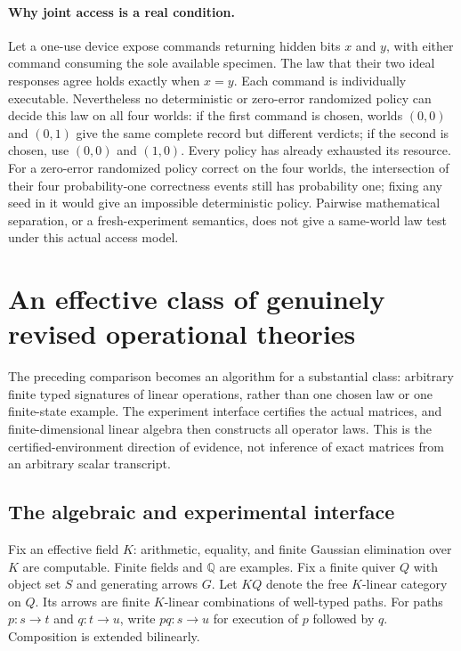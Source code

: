 \documentclass[11pt]{article}
\theoremstyle{definition}
\theoremstyle{remark}\newtheorem{remark}[theorem]{Remark}
\begin{document}
\paragraph{Why joint access is a real condition.}
Let a one-use device expose commands returning hidden bits $x$ and $y$,
with either command consuming the sole available specimen. The law that
their two ideal responses agree holds exactly when $x=y$. Each command
is individually executable. Nevertheless no deterministic or zero-error
randomized policy can decide this law on all four worlds: if the first
command is chosen, worlds $(0,0)$ and $(0,1)$ give the same complete record
but different verdicts; if the second is chosen, use $(0,0)$ and $(1,0)$.
Every policy has already exhausted its resource. For a zero-error randomized
policy correct on the four worlds, the intersection of their four
probability-one correctness events still has probability one; fixing any
seed in it would give an impossible deterministic policy. Pairwise mathematical
separation, or a fresh-experiment semantics, does not give a same-world
law test under this actual access model.

\section{An effective class of genuinely revised operational theories}
\label{sec:linear}
The preceding comparison becomes an algorithm for a substantial class:
arbitrary finite typed signatures of linear operations, rather than one
chosen law or one finite-state example. The experiment interface certifies
the actual matrices, and finite-dimensional linear algebra then constructs
all operator laws. This is the certified-environment direction of evidence,
not inference of exact matrices from an arbitrary scalar transcript.

\subsection{The algebraic and experimental interface}

Fix an effective field $K$: arithmetic, equality, and finite Gaussian
elimination over $K$ are computable. Finite fields and $\mathbb Q$ are
examples. Fix a finite quiver $Q$ with object set $S$ and generating
arrows $G$. Let $KQ$ denote the free $K$-linear category on $Q$.
Its arrows are finite $K$-linear combinations of well-typed paths.
For paths $p:s\to t$ and $q:t\to u$, write $pq:s\to u$ for execution
of $p$ followed by $q$. Composition is extended bilinearly.
\end{document}
